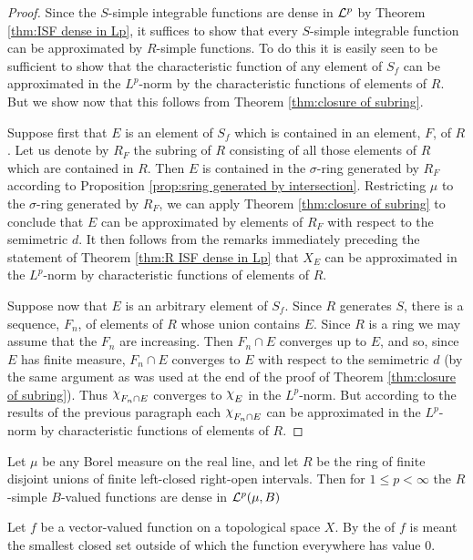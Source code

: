 \begin{proof}
Since the $S$-simple integrable functions are dense in ${\cal L}^p$ by Theorem \ref{thm:ISF dense in Lp}, it suffices to show that every $S$-simple integrable function can be approximated by $R$-simple functions. To do this it is easily seen to be sufficient to show that the characteristic function of any element of $S_f$ can be approximated in the $L^p$-norm by the characteristic functions of elements of $R$. But we show now that this follows from Theorem \ref{thm:closure of subring}.

Suppose first that $E$ is an element of $S_f$ which is contained in an element, $F$, of $R$. Let us denote by $R_F$ the subring of $R$ consisting of all those elements of $R$ which are contained in $R$. %
Then $E$ is contained in the $\sigma$-ring generated by $R_F$ according to Proposition \ref{prop:sring generated by intersection}. Restricting $\mu$ to the $\sigma$-ring generated by $R_F$, we can apply Theorem \ref{thm:closure of subring} to conclude that $E$ can be approximated by elements of $R_F$ with respect to the semimetric $d$. It then follows from the remarks immediately preceding the statement of Theorem \ref{thm:R ISF dense in Lp} that $X_E$ can be approximated in the $L^p$-norm by characteristic functions of elements of $R$.

Suppose now that $E$ is an arbitrary element of $S_f$. Since $R$ generates $S$, there is a sequence, $F_n$, of elements of $R$ whose union contains $E$. Since $R$ is a ring we may assume that the $F_n$ are increasing. Then $F_n\cap E$ converges up to $E$, and so, since $E$ has finite measure, $F_n\cap E$ converges to $E$ with respect to the semimetric $d$ (by the same argument as was used at the end of the proof of Theorem \ref{thm:closure of subring}). Thus $\idf{F_n\cap E}$ converges to $\idf{E}$ in the $L^p$-norm. But according to the results of the previous paragraph each $\idf{F_n\cap E}$ can be approximated in the $L^p$-norm by characteristic functions of elements of $R$.
\end{proof}

\begin{corollary}
\label{cor:lclosed ropen ISF dense in Lp}
Let $\mu$ be any Borel measure on the real line, and let $R$ be the ring of finite disjoint unions of finite left-closed right-open intervals. Then for $1\leq p<\infty$ the $R$-simple $B$-valued functions are dense in ${\cal L}^p(\mu, B)$
\end{corollary}

\begin{definition}
Let $f$ be a vector-valued function on a topological space $X$. By the  of $f$ is meant the smallest closed set outside of which the function everywhere has value $0$.
\end{definition}

